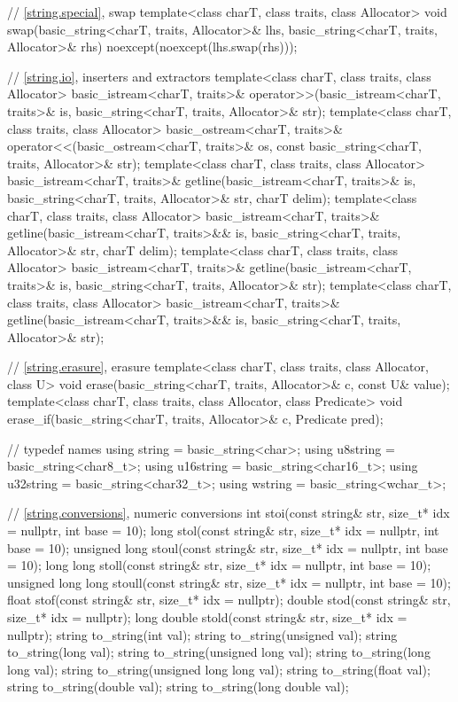\begin{codeblock}
{  // \ref{string.special}, swap
  template<class charT, class traits, class Allocator>
    void swap(basic_string<charT, traits, Allocator>& lhs,
              basic_string<charT, traits, Allocator>& rhs)
      noexcept(noexcept(lhs.swap(rhs)));

  // \ref{string.io}, inserters and extractors
  template<class charT, class traits, class Allocator>
    basic_istream<charT, traits>&
      operator>>(basic_istream<charT, traits>& is,
                 basic_string<charT, traits, Allocator>& str);
  template<class charT, class traits, class Allocator>
    basic_ostream<charT, traits>&
      operator<<(basic_ostream<charT, traits>& os,
                 const basic_string<charT, traits, Allocator>& str);
  template<class charT, class traits, class Allocator>
    basic_istream<charT, traits>&
      getline(basic_istream<charT, traits>& is,
              basic_string<charT, traits, Allocator>& str,
              charT delim);
  template<class charT, class traits, class Allocator>
    basic_istream<charT, traits>&
      getline(basic_istream<charT, traits>&& is,
              basic_string<charT, traits, Allocator>& str,
              charT delim);
  template<class charT, class traits, class Allocator>
    basic_istream<charT, traits>&
      getline(basic_istream<charT, traits>& is,
              basic_string<charT, traits, Allocator>& str);
  template<class charT, class traits, class Allocator>
    basic_istream<charT, traits>&
      getline(basic_istream<charT, traits>&& is,
              basic_string<charT, traits, Allocator>& str);

  // \ref{string.erasure}, erasure
  template<class charT, class traits, class Allocator, class U>
    void erase(basic_string<charT, traits, Allocator>& c, const U& value);
  template<class charT, class traits, class Allocator, class Predicate>
    void erase_if(basic_string<charT, traits, Allocator>& c, Predicate pred);

  //  typedef names
  using string    = basic_string<char>;
  using u8string  = basic_string<char8_t>;
  using u16string = basic_string<char16_t>;
  using u32string = basic_string<char32_t>;
  using wstring   = basic_string<wchar_t>;

  // \ref{string.conversions}, numeric conversions
  int stoi(const string& str, size_t* idx = nullptr, int base = 10);
  long stol(const string& str, size_t* idx = nullptr, int base = 10);
  unsigned long stoul(const string& str, size_t* idx = nullptr, int base = 10);
  long long stoll(const string& str, size_t* idx = nullptr, int base = 10);
  unsigned long long stoull(const string& str, size_t* idx = nullptr, int base = 10);
  float stof(const string& str, size_t* idx = nullptr);
  double stod(const string& str, size_t* idx = nullptr);
  long double stold(const string& str, size_t* idx = nullptr);
  string to_string(int val);
  string to_string(unsigned val);
  string to_string(long val);
  string to_string(unsigned long val);
  string to_string(long long val);
  string to_string(unsigned long long val);
  string to_string(float val);
  string to_string(double val);
  string to_string(long double val);

}
\end{codeblock}
